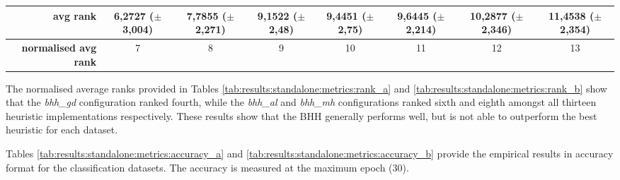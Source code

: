 \documentclass[preprint,review,12pt]{elsarticle}
\begin{document}
\begin{table}[!tb]
{\begin{tabular}{r|c|c|ccccc|}
			\midrule
			\textbf{avg rank}             & \cellcolor[rgb]{ 1,  .922,  .518}6,2727 ($\pm$3,004)                              & \cellcolor[rgb]{ .992,  .776,  .49}7,7855 ($\pm$2,271)  & \cellcolor[rgb]{ .988,  .639,  .467}9,1522 ($\pm$2,48)   & \cellcolor[rgb]{ .984,  .612,  .459}9,4451 ($\pm$2,75)   & \cellcolor[rgb]{ .984,  .592,  .455}9,6445 ($\pm$2,214)  & \cellcolor[rgb]{ .98,  .529,  .443}10,2877 ($\pm$2,346)  & \cellcolor[rgb]{ .973,  .412,  .42}11,4538 ($\pm$2,354)  \\
			\midrule
			\textbf{normalised avg rank}  & \cellcolor[rgb]{ 1,  .922,  .518}7                                                & \cellcolor[rgb]{ .996,  .839,  .502}8                   & \cellcolor[rgb]{ .992,  .753,  .486}9                    & \cellcolor[rgb]{ .988,  .667,  .471}10                   & \cellcolor[rgb]{ .984,  .584,  .455}11                   & \cellcolor[rgb]{ .98,  .498,  .439}12                    & \cellcolor[rgb]{ .973,  .412,  .42}13                    \\
			\cmidrule{3-3}\end{tabular}%
	}
\end{table}%

The normalised average ranks provided in Tables \ref{tab:results:standalone:metrics:rank_a} and \ref{tab:results:standalone:metrics:rank_b} show that the \textit{bhh\_gd} configuration ranked fourth, while the \textit{bhh\_al} and \textit{bhh\_mh} configurations ranked sixth and eighth amongst all thirteen heuristic implementations respectively. These results show that the \acs{BHH} generally performs well, but is not able to outperform the best heuristic for each dataset.

Tables \ref{tab:results:standalone:metrics:accuracy_a} and \ref{tab:results:standalone:metrics:accuracy_b} provide the empirical results in accuracy format for the classification datasets. The accuracy is measured at the maximum epoch (30).
\end{document}
